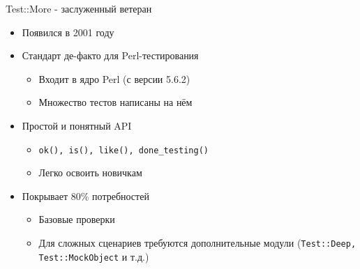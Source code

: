 \begin{frame}[fragile]{Test::More - заслуженный ветеран}
    \begin{itemize}\setlength\itemsep{1.2ex}
        \item Появился в 2001 году
        \item Стандарт де-факто для Perl-тестирования
        \vspace{0.25em}
        \begin{itemize}
            \setlength{\itemsep}{0.5ex}
            \item Входит в ядро Perl (с версии 5.6.2)
            \item Множество тестов написаны на нём
        \end{itemize}
        \item Простой и понятный API
        \vspace{0.25em}
        \begin{itemize}
            \setlength{\itemsep}{0.5ex}
            \item \texttt{ok(), is(), like(), done\_testing()}
            \item Легко освоить новичкам
        \end{itemize}
        \item Покрывает 80\% потребностей
        \vspace{0.25em}
        \begin{itemize}
            \setlength{\itemsep}{0.5ex}
            \item Базовые проверки
            \item Для сложных сценариев требуются дополнительные модули (\texttt{Test::Deep, Test::MockObject} и т.д.)
        \end{itemize}
    \end{itemize}
\end{frame}


